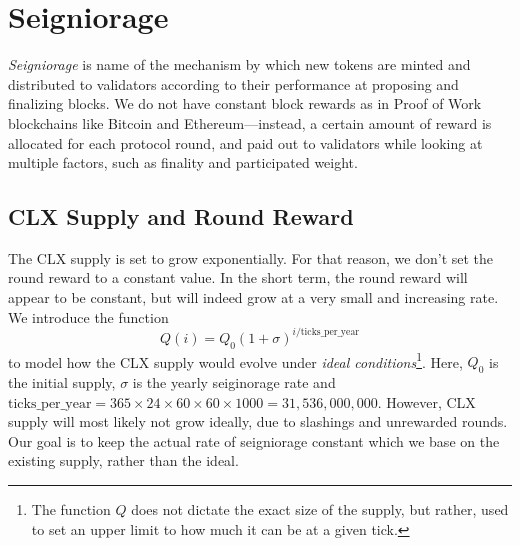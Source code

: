 \section{Seigniorage}
\label{sec:seigniorage}




\emph{Seigniorage} is name of the mechanism by which new tokens are minted and distributed to validators according to their performance at proposing and finalizing blocks. We do not have constant block rewards as in Proof of Work blockchains like Bitcoin and Ethereum---instead, a certain amount of reward is allocated for each protocol round, and paid out to validators while looking at multiple factors, such as finality and participated weight.

\subsection{CLX Supply and Round Reward}

The CLX supply is set to grow exponentially. For that reason, we don't set the round reward to a constant value. In the short term, the round reward will appear to be constant, but will indeed grow at a very small and increasing rate. We introduce the function
%
\begin{equation}
Q(i) = Q_0 (1+\sigma)^{i/\text{ticks\_per\_year}}
\end{equation}
%
to model how the CLX supply would evolve under \emph{ideal conditions}\footnote{The function $Q$ does not dictate the exact size of the supply, but rather, used to set an upper limit to how much it can be at a given tick.}. Here, $Q_0$ is the initial supply, $\sigma$ is the yearly seiginorage rate and $\text{ticks\_per\_year} = 365\times 24\times 60 \times 60 \times 1000 = 31,\!536,\!000,\!000$. However, CLX supply will most likely not grow ideally, due to slashings and unrewarded rounds. Our goal is to keep the actual rate of seigniorage constant which we base on the existing supply, rather than the ideal.

